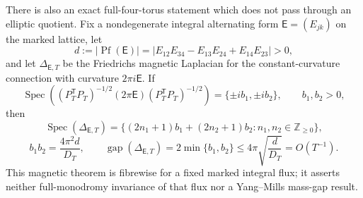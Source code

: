 \documentclass[10pt,letterpaper]{article}
\begin{document}
There is also an exact full-four-torus statement which does not pass through
an elliptic quotient.  Fix a nondegenerate integral alternating form
$\mathsf E=(E_{jk})$ on the marked lattice, let
\[
 d:=|\operatorname{Pf}(\mathsf E)|
 =|E_{12}E_{34}-E_{13}E_{24}+E_{14}E_{23}|>0,
\]
and let $\Delta_{\mathsf E,T}$ be the Friedrichs magnetic Laplacian for the
constant-curvature connection with curvature $2\pi i\mathsf E$.  If
\[
 \operatorname{Spec}\!\left(
 (P_T^{\mathsf T}P_T)^{-1/2}(2\pi\mathsf E)
 (P_T^{\mathsf T}P_T)^{-1/2}\right)
 =\{\pm ib_1,\pm ib_2\},\qquad b_1,b_2>0,
\]
then
\[
 \operatorname{Spec}(\Delta_{\mathsf E,T})
 =\{(2n_1+1)b_1+(2n_2+1)b_2:n_1,n_2\in\mathbb Z_{\ge0}\},
\]
\[
 b_1b_2=\frac{4\pi^2d}{D_T},\qquad
 \operatorname{gap}(\Delta_{\mathsf E,T})
 =2\min\{b_1,b_2\}
 \le4\pi\sqrt{\frac d{D_T}}=O(T^{-1}).
\]
This magnetic theorem is fibrewise for a fixed marked integral flux; it
asserts neither full-monodromy invariance of that flux nor a Yang--Mills
mass-gap result.
\end{document}
